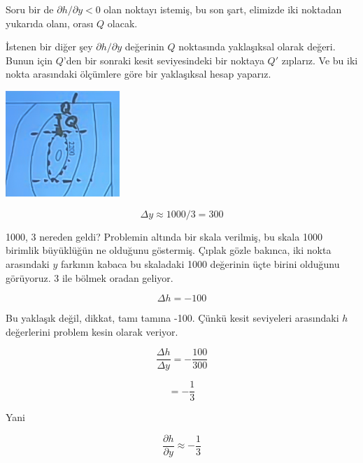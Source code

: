 \documentclass[12pt,fleqn]{article}\usepackage{../../common}
\begin{document}
Soru bir de  $\partial h/\partial y < 0$ olan noktayı istemiş, bu son şart,
elimizde iki noktadan yukarıda olanı, orası $Q$ olacak. 

İstenen bir diğer şey $\partial h/\partial y$ değerinin $Q$ noktasında
yaklaşıksal olarak değeri. Bunun için $Q$'den bir sonraki kesit
seviyesindeki bir noktaya $Q'$ zıplarız. Ve bu iki nokta arasındaki
ölçümlere göre bir yaklaşıksal hesap yaparız. 

\includegraphics[height=4cm]{15_4.png}

$$ \Delta y \approx 1000 / 3 = 300 $$

1000, 3 nereden geldi? Problemin altında bir skala verilmiş, bu skala 1000
birimlik büyüklüğün ne olduğunu göstermiş. Çıplak gözle bakınca, iki nokta
arasındaki $y$ farkının kabaca bu skaladaki 1000 değerinin üçte birini
olduğunu görüyoruz. 3 ile bölmek oradan geliyor. 

$$ \Delta h = -100 $$

Bu yaklaşık değil, dikkat, tamı tamına -100. Çünkü kesit seviyeleri
arasındaki $h$ değerlerini problem kesin olarak veriyor.

$$ 
\frac{\Delta h}{\Delta y} = -\frac{100}{300}
 $$

$$ = -\frac{1}{3} $$

Yani 

$$ 
\frac{\partial h}{\partial y} \approx -\frac{1}{3}
 $$
\end{document}
